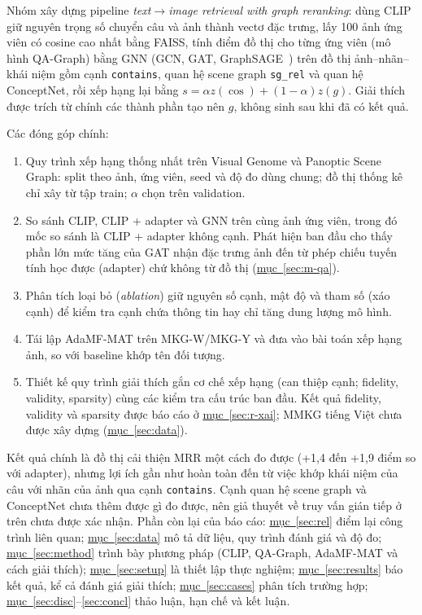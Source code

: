 \documentclass[conference]{IEEEtran}
\begin{document}
Nhóm xây dựng pipeline \emph{text$\rightarrow$image retrieval with graph reranking}: dùng CLIP giữ nguyên trọng số chuyển câu và ảnh thành vectơ đặc trưng, lấy 100 ảnh ứng viên có cosine cao nhất bằng FAISS, tính điểm đồ thị cho từng ứng viên (mô hình QA-Graph) bằng GNN (GCN, GAT, GraphSAGE~\cite{gcn,gat,sage}) trên đồ thị ảnh--nhãn--khái niệm gồm cạnh \texttt{contains}, quan hệ scene graph \texttt{sg\_rel} và quan hệ ConceptNet, rồi xếp hạng lại bằng $s=\alpha z(\cos)+(1-\alpha)z(g)$. Giải thích được trích từ chính các thành phần tạo nên $g$, không sinh sau khi đã có kết quả.

Các đóng góp chính:
\begin{enumerate}
\item Quy trình xếp hạng thống nhất trên Visual Genome và Panoptic Scene Graph: split theo ảnh, ứng viên, seed và độ đo dùng chung; đồ thị thống kê chỉ xây từ tập train; $\alpha$ chọn trên validation.
\item So sánh CLIP, CLIP + adapter và GNN trên cùng ảnh ứng viên, trong đó mốc so sánh là CLIP + adapter không cạnh. Phát hiện ban đầu cho thấy phần lớn mức tăng của GAT nhận đặc trưng ảnh đến từ phép chiếu tuyến tính học được (adapter) chứ không từ đồ thị (\hyperref[sec:m-qa]{mục~\ref*{sec:m-qa}}).
\item Phân tích loại bỏ (\emph{ablation}) giữ nguyên số cạnh, mật độ và tham số (xáo cạnh) để kiểm tra cạnh chứa thông tin hay chỉ tăng dung lượng mô hình.
\item Tái lập AdaMF-MAT trên MKG-W/MKG-Y và đưa vào bài toán xếp hạng ảnh, so với baseline khớp tên đối tượng.
\item Thiết kế quy trình giải thích gắn cơ chế xếp hạng (can thiệp cạnh; fidelity, validity, sparsity) cùng các kiểm tra cấu trúc ban đầu. Kết quả fidelity, validity và sparsity được báo cáo ở \hyperref[sec:r-xai]{mục~\ref*{sec:r-xai}}; MMKG tiếng Việt chưa được xây dựng (\hyperref[sec:data]{mục~\ref*{sec:data}}).
\end{enumerate}

Kết quả chính là đồ thị cải thiện MRR một cách đo được (+1,4 đến +1,9 điểm so với adapter), nhưng lợi ích gần như hoàn toàn đến từ việc khớp khái niệm của câu với nhãn của ảnh qua cạnh \texttt{contains}. Cạnh quan hệ scene graph và ConceptNet chưa thêm được gì đo được, nên giả thuyết về truy vấn gián tiếp ở trên chưa được xác nhận. Phần còn lại của báo cáo: \hyperref[sec:rel]{mục~\ref*{sec:rel}} điểm lại công trình liên quan; \hyperref[sec:data]{mục~\ref*{sec:data}} mô tả dữ liệu, quy trình đánh giá và độ đo; \hyperref[sec:method]{mục~\ref*{sec:method}} trình bày phương pháp (CLIP, QA-Graph, AdaMF-MAT và cách giải thích); \hyperref[sec:setup]{mục~\ref*{sec:setup}} là thiết lập thực nghiệm; \hyperref[sec:results]{mục~\ref*{sec:results}} báo kết quả, kể cả đánh giá giải thích; \hyperref[sec:cases]{mục~\ref*{sec:cases}} phân tích trường hợp; \hyperref[sec:disc]{mục~\ref*{sec:disc}}--\ref{sec:concl} thảo luận, hạn chế và kết luận.
\end{document}
